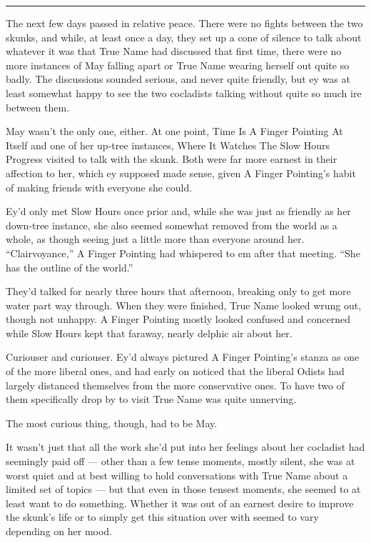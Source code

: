 \begin{center}\rule{0.5\linewidth}{0.5pt}\end{center}

The next few days passed in relative peace. There were no fights between the two skunks, and while, at least once a day, they set up a cone of silence to talk about whatever it was that True Name had discussed that first time, there were no more instances of May falling apart or True Name wearing herself out quite so badly. The discussions sounded serious, and never quite friendly, but ey was at least somewhat happy to see the two cocladists talking without quite so much ire between them.

May wasn't the only one, either. At one point, Time Is A Finger Pointing At Itself and one of her up-tree instances, Where It Watches The Slow Hours Progress visited to talk with the skunk. Both were far more earnest in their affection to her, which ey supposed made sense, given A Finger Pointing's habit of making friends with everyone she could.

Ey'd only met Slow Hours once prior and, while she was just as friendly as her down-tree instance, she also seemed somewhat removed from the world as a whole, as though seeing just a little more than everyone around her. ``Clairvoyance,'' A Finger Pointing had whispered to em after that meeting. ``She has the outline of the world.''

They'd talked for nearly three hours that afternoon, breaking only to get more water part way through. When they were finished, True Name looked wrung out, though not unhappy. A Finger Pointing mostly looked confused and concerned while Slow Hours kept that faraway, nearly delphic air about her.

Curiouser and curiouser. Ey'd always pictured A Finger Pointing's stanza as one of the more liberal ones, and had early on noticed that the liberal Odists had largely distanced themselves from the more conservative ones. To have two of them specifically drop by to visit True Name was quite unnerving.

The most curious thing, though, had to be May.

It wasn't just that all the work she'd put into her feelings about her cocladist had seemingly paid off — other than a few tense moments, mostly silent, she was at worst quiet and at best willing to hold conversations with True Name about a limited set of topics — but that even in those tensest moments, she seemed to at least want to do something. Whether it was out of an earnest desire to improve the skunk's life or to simply get this situation over with seemed to vary depending on her mood.

